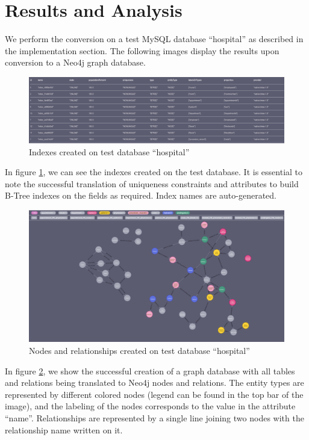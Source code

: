 \documentclass[12pt]{article}
\newcommand{\sectionfontstyle}{\fontsize{16pt}{1em}\usefont{T1}{phv}{b}{n}}
\begin{document}
    \newpage

    \section{\sectionfontstyle Results and Analysis}
    We perform the conversion on a test MySQL database ``hospital'' as described in the implementation section. The following images display the results upon conversion to a Neo4j graph database.

    \begin{figure}[htb!]
        \centering
        \includegraphics[width=155mm]{img/created_indices.png}
        \caption{Indexes created on test database ``hospital''}
        \label{fig:created_indices}
    \end{figure}

    In figure \ref{fig:created_indices}, we can see the indexes created on the test database. It is essential to note the successful translation of uniqueness constraints and attributes to build B-Tree indexes on the fields as required. Index names are auto-generated.

    \begin{figure}[htb!]
        \centering
        \includegraphics[width=155mm]{img/created_nodes.png}
        \caption{Nodes and relationships created on test database ``hospital''}
        \label{fig:nodes_rels}
    \end{figure}

    In figure \ref{fig:nodes_rels}, we show the successful creation of a graph database with all tables and relations being translated to Neo4j nodes and relations. The entity types are represented by different colored nodes (legend can be found in the top bar of the image), and the labeling of the nodes corresponds to the value in the attribute ``name''. Relationships are represented by a single line joining two nodes with the relationship name written on it. 
\end{document}

